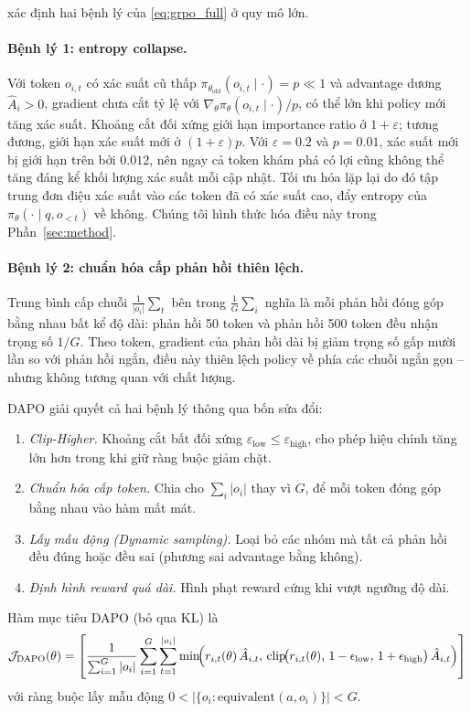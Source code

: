\documentclass[11pt,a4paper]{article}
\begin{document}
\citet{yu2025dapo} xác định hai bệnh lý của \eqref{eq:grpo_full} ở quy mô lớn.

\paragraph{Bệnh lý 1: entropy collapse.} Với token \(o_{i,t}\) có xác suất cũ thấp
\(\pi_{\theta_{\text{old}}}(o_{i,t}\mid\cdot) = p\ll 1\) và advantage dương
\(\hat{A}_i>0\), gradient chưa cắt tỷ lệ với
\(\nabla_\theta \pi_\theta(o_{i,t}\mid\cdot)/p\), có thể lớn khi policy mới
tăng xác suất. Khoảng cắt đối xứng giới hạn importance ratio ở
\(1+\varepsilon\); tương đương, giới hạn xác suất mới ở \((1+\varepsilon)p\).
Với \(\varepsilon=0.2\) và \(p=0.01\), xác suất mới bị giới hạn trên bởi
\(0.012\), nên ngay cả token khám phá có lợi cũng không thể tăng đáng kể khối lượng
xác suất mỗi cập nhật. Tối ưu hóa lặp lại do đó tập trung đơn điệu xác suất vào
các token đã có xác suất cao, đẩy entropy của \(\pi_\theta(\cdot\mid q,o_{<t})\) về
không. Chúng tôi hình thức hóa điều này trong Phần~\ref{sec:method}.

\paragraph{Bệnh lý 2: chuẩn hóa cấp phản hồi thiên lệch.} Trung bình cấp chuỗi
\(\tfrac{1}{|o_i|}\sum_t\) bên trong \(\tfrac{1}{G}\sum_i\) nghĩa là mỗi phản hồi
đóng góp bằng nhau bất kể độ dài: phản hồi 50 token và phản hồi 500 token
đều nhận trọng số \(1/G\). Theo token, gradient của phản hồi dài bị
giảm trọng số gấp mười lần so với phản hồi ngắn, điều này thiên lệch
policy về phía các chuỗi ngắn gọn -- nhưng không tương quan với chất lượng.

DAPO giải quyết cả hai bệnh lý thông qua bốn sửa đổi:
\begin{enumerate}[leftmargin=*,noitemsep]
  \item \emph{Clip-Higher.} Khoảng cắt bất đối xứng
        \(\varepsilon_{\text{low}}\le\varepsilon_{\text{high}}\), cho phép hiệu chỉnh tăng lớn hơn
        trong khi giữ ràng buộc giảm chặt.
  \item \emph{Chuẩn hóa cấp token.} Chia cho \(\sum_i|o_i|\) thay vì \(G\),
        để mỗi token đóng góp bằng nhau vào hàm mất mát.
  \item \emph{Lấy mẫu động (Dynamic sampling).} Loại bỏ các nhóm mà tất cả phản hồi đều đúng hoặc
        đều sai (phương sai advantage bằng không).
  \item \emph{Định hình reward quá dài.} Hình phạt reward cứng khi vượt ngưỡng
        độ dài.
\end{enumerate}
Hàm mục tiêu DAPO (bỏ qua KL) là
\begin{equation}
\mathcal{J}_{\mathrm{DAPO}}(\theta) 
=
\left[
\frac{1}{\sum_{i=1}^G |o_i|}
\sum_{i=1}^G \sum_{t=1}^{|o_i|}
\min\!\Bigl(
r_{i,t}(\theta)\,\hat{A}_{i,t},\,
\text{clip}\!\bigl(r_{i,t}(\theta),\,1-\epsilon_{\mathrm{low}},\,1+\epsilon_{\mathrm{high}}\bigr)\,\hat{A}_{i,t}
\Bigr)
\right]
\label{eq:dapo}
\end{equation}
với ràng buộc lấy mẫu động
\(0<\bigl|\{o_i:\text{equivalent}(a,o_i)\}\bigr|<G\).
\end{document}
